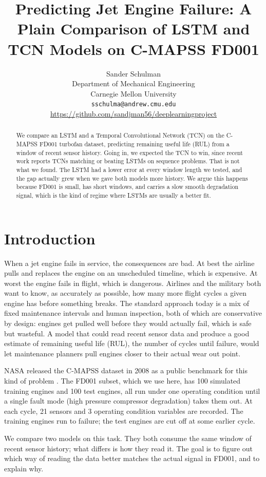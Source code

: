 \documentclass{article}
\title{Predicting Jet Engine Failure: A Plain Comparison of LSTM and TCN Models on C-MAPSS FD001}
\author{
  Sander Schulman \\
  Department of Mechanical Engineering \\
  Carnegie Mellon University \\
  \texttt{sschulma@andrew.cmu.edu} \\
  \url{https://github.com/sandjman56/deeplearningproject}
}
\begin{document}
\maketitle


\begin{abstract}
We compare an LSTM and a Temporal Convolutional Network (TCN) on the C-MAPSS FD001 turbofan dataset, predicting remaining useful life (RUL) from a window of recent sensor history. Going in, we expected the TCN to win, since recent work reports TCNs matching or beating LSTMs on sequence problems. That is not what we found. The LSTM had a lower error at every window length we tested, and the gap actually grew when we gave both models more history. We argue this happens because FD001 is small, has short windows, and carries a slow smooth degradation signal, which is the kind of regime where LSTMs are usually a better fit.
\end{abstract}


\section{Introduction}

When a jet engine fails in service, the consequences are bad. At best the airline pulls and replaces the engine on an unscheduled timeline, which is expensive. At worst the engine fails in flight, which is dangerous. Airlines and the military both want to know, as accurately as possible, how many more flight cycles a given engine has before something breaks. The standard approach today is a mix of fixed maintenance intervals and human inspection, both of which are conservative by design: engines get pulled well before they would actually fail, which is safe but wasteful. A model that could read recent sensor data and produce a good estimate of remaining useful life (RUL), the number of cycles until failure, would let maintenance planners pull engines closer to their actual wear out point.

NASA released the C-MAPSS dataset in 2008 as a public benchmark for this kind of problem \citep{saxena2008cmapss}. The FD001 subset, which we use here, has 100 simulated training engines and 100 test engines, all run under one operating condition until a single fault mode (high pressure compressor degradation) takes them out. At each cycle, 21 sensors and 3 operating condition variables are recorded. The training engines run to failure; the test engines are cut off at some earlier cycle.

We compare two models on this task. They both consume the same window of recent sensor history; what differs is how they read it. The goal is to figure out which way of reading the data better matches the actual signal in FD001, and to explain why.
\end{document}
